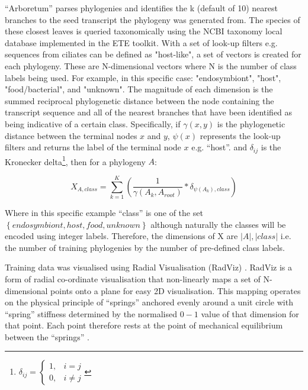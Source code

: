 ``Arboretum'' parses phylogenies and identifies the k (default of 10) nearest branches to the seed transcript
the phylogeny was generated from.  The species of these closest leaves is queried taxonomically using the
NCBI taxonomy local database implemented in the ETE toolkit.  With a set of look-up filters e.g.
sequences from ciliates can be defined as "host-like", a set of vectors is created for each phylogeny.  
These are N-dimensional vectors where N is the number of class labels being used. 
For example, in this specific case: "endosymbiont", "host", "food/bacterial", and "unknown".
The magnitude of each dimension is the summed reciprocal phylogenetic distance between the node containing the 
transcript sequence and all
of the nearest branches that have been identified as being indicative of a certain class.
Specifically, if \(\gamma(x,y)\) is the phylogenetic distance between the terminal nodes \(x\) and \(y\), \(\psi(x)\) 
represents the look-up filters and returns the label of the terminal node \(x\) e.g. ``host''.
and \(\delta_{ij}\) is the Kronecker delta\footnote{
    \(\delta_{ij}= \begin{cases}
	1, &  i = j\\
	0, & i \neq j 
	\end{cases} \)}, then for a phylogeny \(A\):
\begin{center}
	\[
X_{A, class} = \sum_{k=1}^K \left( \frac{1}{\gamma(A_k, A_{root})} * \delta_{\psi(A_k),class} \right)
	\]
\end{center}
Where in this specific example ``class'' is one of the set \(\left\{endosymbiont, host, food, unknown\right\}\)
although naturally the classes will be encoded using integer labels.
Therefore, the dimensions of X are \(|A|,|class|\) i.e. the number of training phylogenies by the
number of pre-defined class labels.

Training data was visualised using Radial Visualisation (RadViz) \citep{Hoffman1997,Fayyad2001}.
RadViz is a form of radial co-ordinate visualisation that non-linearly maps a set of N-dimensional 
points onto a plane for easy 2D visualisation. This mapping operates on the physical principle
of ``springs'' anchored evenly around a unit circle with ``spring'' stiffness determined by 
the normalised \(0-1\) value of that dimension for that point.  Each point therefore rests
at the point of mechanical equilibrium between the ``springs'' \citep{NovakovaLenkaandStepankova2006}.

